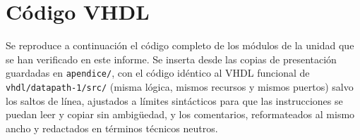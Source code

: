 \documentclass[llncs]{llncs}
\begin{document}



\appendix
\section{Código VHDL}
\label{app:codigo}

Se reproduce a continuación el código completo de los módulos de la
unidad que se han verificado en este informe. Se inserta desde las copias
de presentación guardadas en \texttt{apendice/}, con el código idéntico
al VHDL funcional de \texttt{vhdl/datapath-1/src/} (misma lógica, mismos
recursos y mismos puertos) salvo los saltos de línea, ajustados a límites
sintácticos para que las instrucciones se puedan leer y copiar sin
ambigüedad, y los comentarios, reformateados al mismo ancho y redactados
en términos técnicos neutros.










\end{document}

